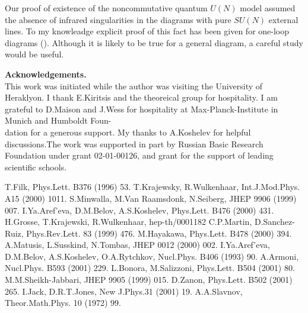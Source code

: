 \documentclass[a4paper,12pt]{article}
\begin{document}
 Our proof of existence of the noncommutative quantum $U(N)$ model 
  assumed the absence of infrared singularities in the diagrams with 
  pure $SU(N)$ external lines. To my knowleadge explicit proof of this 
  fact has been given for one-loop diagrams (\cite{AA}). Although it is 
  likely to be true for a general diagram, a careful study 
  would be useful.
  

 {\bf Acknowledgements.} \\
This work was initiated while the author was visiting the University of 
 Heraklyon. I thank E.Kiritsis and the theoreical group for hospitality. I 
 am grateful to D.Maison and J.Wess for hospitality at 
 Max-Planck-Institute in Munich and Humboldt Foun-\\dation for a generous 
 support. My thanks to A.Koshelev for helpful discussions.The work was 
 supported in part by Russian Basic Research Foundation under grant 
 02-01-00126, and grant for the support of leading scientific schools.  
 \begin{thebibliography}{99}{\small {} T.Filk, Phys.Lett. B376 
 (1996) 53.  T.Krajewsky, R.Wulkenhaar, 
 Int.J.Mod.Phys. A15 (2000) 1011. 
   S.Minwalla, M.Van Raamsdonk, N.Seiberg, 
 JHEP 9906 (1999) 007. 
   I.Ya.Aref'eva, 
 D.M.Belov, A.S.Koshelev, Phys.Lett. B476 (2000) 431.  
 H.Grosse, T.Krajewski, R.Wulkenhaar, hep-th/0001182
 C.P.Martin, D.Sanchez-Ruiz, Phys.Rev.Lett. 83 (1999) 476. 
  M.Hayakawa, Phys.Lett. B478 (2000) 394. 
   A.Matusis, L.Susskind, N.Tombas, JHEP 0012 
 (2000) 002.  
 I.Ya.Aref'eva, D.M.Belov,  A.S.Koshelev, O.A.Rytchkov,  
Nucl.Phys. B406 (1993) 90.   A.Armoni, Nucl.Phys. B593 (2001) 
 229.   L.Bonora, M.Salizzoni, Phys.Lett. B504 (2001) 80.  
  M.M.Sheikh-Jabbari, JHEP 9905 (1999) 015.   
 D.Zanon, Phys.Lett.  B502 (2001) 265.   I.Jack, D.R.T.Jones, 
New J.Phys.31 (2001) 19.   A.A.Slavnov, 
Theor.Math.Phys.  10 (1972) 99.} \end{thebibliography} 
\end{document}
